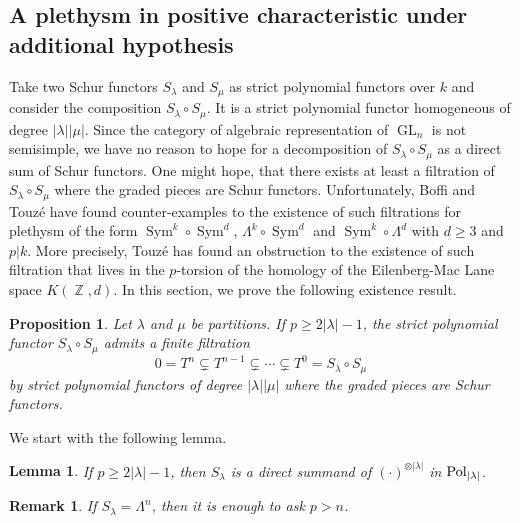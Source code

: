 \documentclass[11pt]{amsart}
\numberwithin{subsection}{section}
\numberwithin{figure}{section}
\numberwithin{table}{section}
\theoremstyle{1}
\newtheorem{lemma}[theorem]{Lemma}
\newtheorem{proposition}[theorem]{Proposition}
\theoremstyle{2}
\newtheorem{rmrk}[theorem]{Remark}
\DeclareMathOperator{\Z}{\mathbb{Z}}
\DeclareMathOperator{\GL}{GL}
\DeclareMathOperator{\Sym}{Sym}
\DeclareMathOperator{\Pol}{\normalfont \textsf{Pol}}
\begin{document}
\subsection{A plethysm in positive characteristic under additional hypothesis}
Take two Schur functors $S_{\lambda}$ and $S_{\mu}$ as strict polynomial functors over $k$ and consider the composition $S_{\lambda} \circ S_{\mu}$. It is a strict polynomial functor homogeneous of degree $|\lambda| |\mu |$. Since the category of algebraic representation of $\GL_n$ is not semisimple, we have no reason to hope for a decomposition of $S_{\lambda} \circ S_{\mu}$ as a direct sum of Schur functors. One might hope, that there exists at least a filtration of $S_{\lambda} \circ S_{\mu}$ where the graded pieces are Schur functors. Unfortunately, Boffi \cite{MR1128609} and Touzé \cite[Corollary 6.10.]{MR3042627} have found counter-examples to the existence of such filtrations for plethysm of the form $\Sym^k \circ \Sym^d$, $\Lambda^k \circ \Sym^d$ and $\Sym^k \circ \Lambda^d$ with $d \geq 3$ and $p | k$. More precisely, Touzé has found an obstruction to the existence of such filtration that lives in the $p$-torsion of the homology of the Eilenberg-Mac Lane space $K(\Z,d)$. In this section, we prove the following existence result. 
\begin{proposition}\label{th_plethysm}
Let $\lambda$ and $\mu$ be partitions. If $p \geq 2|\lambda |-1$, the strict polynomial functor $S_{\lambda} \circ S_{\mu}$ admits a finite filtration
\begin{equation*}
0 =T^n \subsetneq T^{n-1} \subsetneq
 \cdots \subsetneq
 T^0 = S_{\lambda} \circ S_{\mu}
\end{equation*}
by strict polynomial functors of degree $|\lambda| |\mu |$ where the graded pieces are Schur functors.
\end{proposition}
\vspace*{0.2cm}
We start with the following lemma.
\begin{lemma}\label{lem7}
If $p \geq 2|\lambda |-1$, then $S_{\lambda}$ is a direct summand of $(\cdot)^{\otimes |\lambda |}$ in $\Pol_{|\lambda |}$.
\end{lemma}
\begin{rmrk}
If $S_{\lambda} = \Lambda^n$, then it is enough to ask $p > n$.
\end{rmrk}
\end{document}
